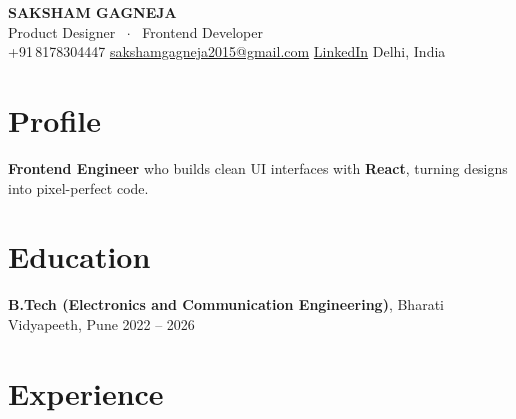 \documentclass[10pt,a4paper]{article}
\begin{document}

\begin{center}
  {\LARGE\bfseries\color{accent} SAKSHAM GAGNEJA}\\[4pt]
  {\small\textcolor{midgrey}{Product Designer \ $\cdot$ \ Frontend Developer}}\\[3pt]
  {\small
    +91\,8178304447 \quad
    \href{mailto:sakshamgagneja2015@gmail.com}{sakshamgagneja2015@gmail.com} \quad
    \href{https://www.linkedin.com/in/saksham-gagneja-2665a124a}{LinkedIn} \quad
    Delhi, India
  }
\end{center}

\vspace{2pt}

\section{Profile}
\textbf{Frontend Engineer} who builds clean UI interfaces with \textbf{React}, turning designs into pixel-perfect code.

\section{Education}
\textbf{B.Tech (Electronics and Communication Engineering)},
Bharati Vidyapeeth, Pune \hfill 2022 -- 2026

\section{Experience}
\end{document}

